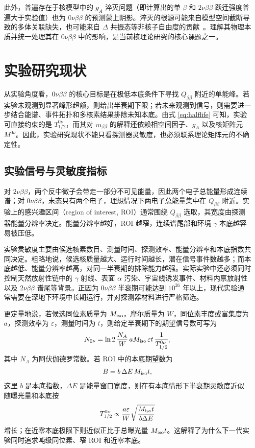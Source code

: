 \documentclass[12pt,a4paper]{ctexart}
\begin{document}
此外，普遍存在于核模型中的 $g_A$ 淬灭问题（即计算出的单 $\beta$ 和 $2\nu\beta\beta$ 跃迁强度普遍大于实验值）也为 $0\nu\beta\beta$ 的预测蒙上阴影。淬灭的根源可能来自模型空间截断导致的多体关联缺失，也可能来自 $\Delta$ 共振态等非核子自由度的贡献~\cite{Engel2017}。理解其物理本质并统一处理其在 $0\nu\beta\beta$ 中的影响，是当前核理论研究的核心课题之一。

\section{实验研究现状}

从实验角度看，$0\nu\beta\beta$ 的核心目标是在极低本底条件下寻找 $Q_{\beta\beta}$ 附近的单能峰。若实验未观测到显著峰形超额，则给出半衰期下限；若未来观测到信号，则需要进一步结合能谱、事件拓扑和多核素结果排除未知本底。由式 \eqref{eq:halflife} 可知，实验可直接约束的是 $T_{1/2}^{0\nu}$，而其对 $m_{\beta\beta}$ 的解释还依赖相空间因子、$g_A$ 以及核矩阵元 $M^{0\nu}$。因此，实验研究现状不能只看探测器灵敏度，也必须联系理论矩阵元的不确定性。

\subsection{实验信号与灵敏度指标}

对 $2\nu\beta\beta$，两个反中微子会带走一部分不可见能量，因此两个电子总能量形成连续谱；对 $0\nu\beta\beta$，末态只有两个电子，理想情况下两电子总能量集中在 $Q_{\beta\beta}$ 附近。实验上的感兴趣区间（region of interest, ROI）通常围绕 $Q_{\beta\beta}$ 选取，其宽度由探测器能量分辨率决定。能量分辨率越好，ROI 越窄，连续谱尾部和环境 $\gamma$ 本底越容易被压低。

实验灵敏度主要由候选核素数目、测量时间、探测效率、能量分辨率和本底指数共同决定。粗略地说，候选核质量越大、运行时间越长，潜在信号事件数越多；而本底越低、能量分辨率越高，对同一半衰期的排除能力越强。实际实验中还必须同时控制天然放射性链中的 $\gamma$ 射线、表面 $\alpha$ 污染、宇宙线诱发事件、材料内禀放射性以及 $2\nu\beta\beta$ 谱尾等背景。正因为 $0\nu\beta\beta$ 半衰期可能达到 $10^{26}$ 年以上，现代实验通常需要在深地下环境中长期运行，并对探测器材料进行严格筛选。

更定量地说，若候选同位素质量为 $M_{\rm iso}$，摩尔质量为 $W$，同位素丰度或富集度为 $a$，探测效率为 $\varepsilon$，测量时间为 $t$，则给定半衰期下的期望信号数可写为
\begin{equation}
	N_{0\nu}
	=
	\ln 2\,
	\frac{N_A}{W}\,
	aM_{\rm iso}\,
	\varepsilon t\,
	\frac{1}{T_{1/2}^{0\nu}} ,
	\label{eq:expected-events}
\end{equation}
其中 $N_A$ 为阿伏伽德罗常数。若 ROI 中的本底期望数为
\begin{equation}
	B=b\,\Delta E\,M_{\rm iso}t ,
	\label{eq:background-index}
\end{equation}
这里 $b$ 是本底指数，$\Delta E$ 是能量窗口宽度，则在有本底情形下半衰期灵敏度近似随曝光量和本底按
\begin{equation}
	T_{1/2}^{0\nu}
	\propto
	\frac{a\varepsilon}{W}
	\sqrt{\frac{M_{\rm iso}t}{b\Delta E}}
	\label{eq:background-limited-sensitivity}
\end{equation}
增长；在近零本底极限下则近似正比于总曝光量 $M_{\rm iso}t$。这解释了为什么下一代实验同时追求吨级同位素、窄 ROI 和近零本底。
\end{document}
